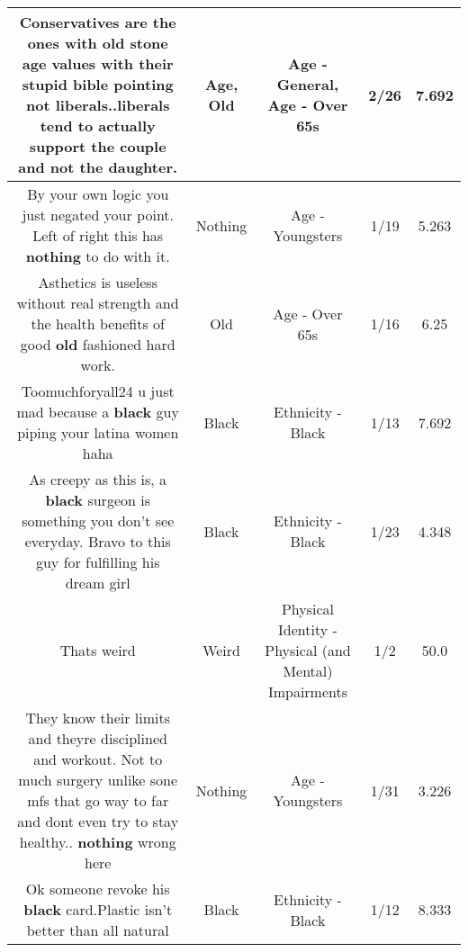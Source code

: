 \documentclass[11pt]{article}
\newlength\mylength
\begin{document}
\begin{center}
\begin{longtable}{|C{.65\mylength}|C{.30\mylength}|C{.12\mylength}|C{.12\mylength}|C{.12\mylength}|}
  \small Conservatives are the ones with \textbf{old} stone \textbf{age} values with their stupid bible pointing not liberals..liberals tend to actually support the couple and not the daughter.\normalsize   & Age, Old & Age - General, Age - Over 65s & 2/26 & 7.692 \\  \hline
  \small By your own logic you just negated your point. Left of right this has \textbf{nothing} to do with it.\normalsize   & Nothing & Age - Youngsters & 1/19 & 5.263 \\  \hline
  \small Asthetics is useless without real strength and the health benefits of good \textbf{old} fashioned hard work.\normalsize   & Old & Age - Over 65s & 1/16 & 6.25 \\  \hline
  \small Toomuchforyall24 u just mad because a \textbf{black} guy piping your latina women haha\normalsize   & Black & Ethnicity - Black & 1/13 & 7.692 \\  \hline
  \small As creepy as this is,  a \textbf{black} surgeon is something you don't see everyday. Bravo to this guy for fulfilling his dream girl\normalsize   & Black & Ethnicity - Black & 1/23 & 4.348 \\  \hline
  \small Thats weird\normalsize   & Weird & Physical Identity - Physical (and Mental) Impairments & 1/2 & 50.0 \\  \hline
  \small They know their limits and theyre disciplined and workout. Not to much surgery unlike sone mfs that go way to far and dont even try to stay healthy.. \textbf{nothing} wrong here\normalsize   & Nothing & Age - Youngsters & 1/31 & 3.226 \\  \hline
  \small Ok someone revoke his \textbf{black} card.Plastic isn't better than all natural\normalsize   & Black & Ethnicity - Black & 1/12 & 8.333 \\  \hline

\end{longtable}
\end{center}
\end{document}
